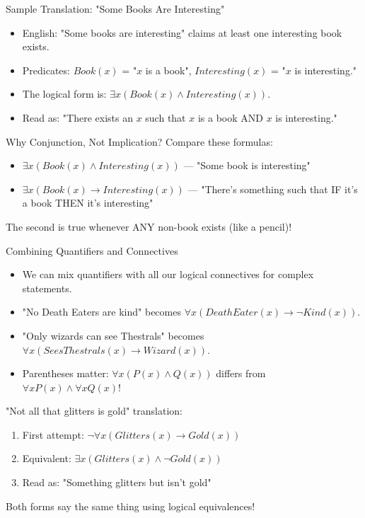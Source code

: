 \documentclass{beamer}
\begin{document}
	\begin{frame}{Sample Translation: "Some Books Are Interesting"}
		\begin{itemize}
			\item English: "Some books are interesting" claims at least one interesting book exists.
			\item Predicates: $Book(x)$ = "$x$ is a book", $Interesting(x)$ = "$x$ is interesting."
			\item The logical form is: $\exists x (Book(x) \wedge Interesting(x))$.
			\item Read as: "There exists an $x$ such that $x$ is a book AND $x$ is interesting."
		\end{itemize}
		
		\begin{alertblock}{Why Conjunction, Not Implication?}
			Compare these formulas:
			\begin{itemize}
				\item $\exists x (Book(x) \wedge Interesting(x))$ — "Some book is interesting" \checkmark
				\item $\exists x (Book(x) \rightarrow Interesting(x))$ — "There's something such that IF it's a book THEN it's interesting"
			\end{itemize}
			The second is true whenever ANY non-book exists (like a pencil)!
		\end{alertblock}
	\end{frame}
	
	\begin{frame}{Combining Quantifiers and Connectives}
		\begin{itemize}
			\item We can mix quantifiers with all our logical connectives for complex statements.
			\item "No Death Eaters are kind" becomes $\forall x (DeathEater(x) \rightarrow \neg Kind(x))$.
			\item "Only wizards can see Thestrals" becomes $\forall x (SeesThestrals(x) \rightarrow Wizard(x))$.
			\item Parentheses matter: $\forall x (P(x) \wedge Q(x))$ differs from $\forall x P(x) \wedge \forall x Q(x)$!
		\end{itemize}
		
		\begin{example}
			"Not all that glitters is gold" translation:
			\begin{enumerate}
				\item First attempt: $\neg \forall x (Glitters(x) \rightarrow Gold(x))$ 
				\item Equivalent: $\exists x (Glitters(x) \wedge \neg Gold(x))$
				\item Read as: "Something glitters but isn't gold"
			\end{enumerate}
			Both forms say the same thing using logical equivalences!
		\end{example}
	\end{frame}
	
\end{document}
